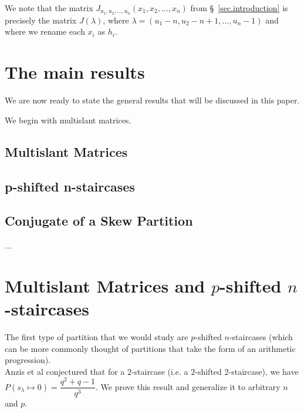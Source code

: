 \documentclass[numbers=enddot,12pt,final,onecolumn,notitlepage]{scrartcl}%
\theoremstyle{definition}
\newtheorem{defi}[theo]{Definition}
\newenvironment{definition}[1][]
{\begin{defi}[#1]\begin{leftbar}}
{\end{leftbar}\end{defi}}
\newcommand{\NN}{\mathbb{N}}
\newcommand{\tup}[1]{\left( #1 \right)}
\theoremstyle{plainsl}
\begin{document}

We note that the matrix $J_{u_1, u_2, \ldots, u_n}\tup{x_1, x_2, \ldots, x_n}$
from \S~\ref{sec.introduction} is precisely the matrix
$J\tup{\lambda}$, where
$\lambda = \tup{u_1 - n, u_2 - n+1, \ldots, u_n -1}$
and where we rename each $x_i$ as $h_i$.



\section{The main results}

We are now ready to state the general results that will be discussed in this paper.

We begin with multislant matrices.
\subsection{Multislant Matrices}
\subsection{p-shifted n-staircases}
\subsection{Conjugate of a Skew Partition}
...



\section{Multislant Matrices and $p$-shifted $n$-staircases}
The first type of partition that we would study are $p$-shifted $n$-staircases (which can be more commonly thought of partitions that take the form of an arithmetic progression). \\


Anzis et al \cite{Anzis18} conjectured that for a $2$-staircase (i.e. a $2$-shifted $2$-staircase), we have $P(s_{\lambda} \longmapsto 0) = \dfrac{q^2+q -1}{q^3}$. We prove this result and generalize it to arbitrary $n$ and $p$.
\end{document}
